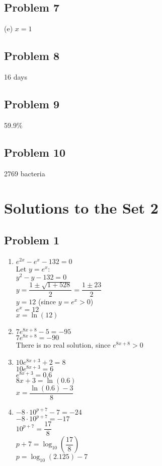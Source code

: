 \documentclass[12pt]{article}
\begin{document}
\subsection*{Problem 7}
(e) \( x = 1 \)

\subsection*{Problem 8}
16 days

\subsection*{Problem 9}
59.9\%

\subsection*{Problem 10}
2769 bacteria

\section*{Solutions to the Set 2}
\subsection*{Problem 1}
\begin{enumerate}[label=(\alph*)]
    \item $e^{2x} - e^x - 132 = 0$ \\
          Let $y = e^x$: \\
          $y^2 - y - 132 = 0$ \\
          $y = \dfrac{1 \pm \sqrt{1 + 528}}{2} = \dfrac{1 \pm 23}{2}$ \\
          $y = 12$ \quad (since $y = e^x > 0$) \\
          $e^x = 12$ \\
          $x = \ln(12)$

    \item $7e^{8x+8} - 5 = -95$ \\
          $7e^{8x+8} = -90$ \\
          There is no real solution, since $e^{8x+8} > 0$

    \item $10e^{8x+3} + 2 = 8$ \\
          $10e^{8x+3} = 6$ \\
          $e^{8x+3} = 0.6$ \\
          $8x + 3 = \ln(0.6)$ \\
          $x = \dfrac{\ln(0.6) - 3}{8}$

    \item $-8 \cdot 10^{p+7} - 7 = -24$ \\
          $-8 \cdot 10^{p+7} = -17$ \\
          $10^{p+7} = \dfrac{17}{8}$ \\
          $p + 7 = \log_{10}\left(\dfrac{17}{8}\right)$ \\
          $p = \log_{10}(2.125) - 7$
\end{enumerate}
\end{document}
